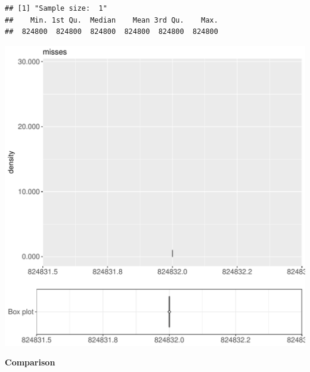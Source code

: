 \documentclass{article}\usepackage[]{graphicx}\usepackage[]{color}
\makeatletter
\def\maxwidth{ %
  \ifdim\Gin@nat@width>\linewidth
    \linewidth
  \else
    \Gin@nat@width
  \fi
}
\newenvironment{kframe}{%
 \def\at@end@of@kframe{}%
 \ifinner\ifhmode%
  \def\at@end@of@kframe{\end{minipage}}%
  \begin{minipage}{\columnwidth}%
 \fi\fi%
 \def\FrameCommand##1{\hskip\@totalleftmargin \hskip-\fboxsep
 \colorbox{shadecolor}{##1}\hskip-\fboxsep
     \hskip-\linewidth \hskip-\@totalleftmargin \hskip\columnwidth}%
 \MakeFramed {\advance\hsize-\width
   \@totalleftmargin\z@ \linewidth\hsize
   \@setminipage}}%
 {\par\unskip\endMakeFramed%
 \at@end@of@kframe}
\newenvironment{knitrout}{}{} %
\makeatother
\begin{document}
\begin{knitrout}
\color{fgcolor}\begin{kframe}
\begin{verbatim}
## [1] "Sample size:  1"
##    Min. 1st Qu.  Median    Mean 3rd Qu.    Max. 
##  824800  824800  824800  824800  824800  824800
\end{verbatim}


{\ttfamily\noindent\bfseries{}}\end{kframe}
\includegraphics[width=\maxwidth]{figure/RH4_trivialcaching_password2-1} 

\end{knitrout}
  
 \textbf{Comparison}
  
\end{document}
